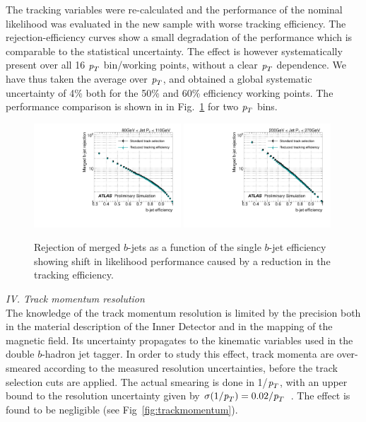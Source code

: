 The tracking variables were re-calculated and the performance of the nominal likelihood was evaluated in the new sample with worse tracking efficiency. The rejection-efficiency curves %
 show a small degradation of the performance which is comparable to the statistical uncertainty. The effect is however systematically present over all 16 ${\emph{p}_{T}}$ bin/working points, without a clear ${\emph{p}_{T}}$ dependence. We have thus taken the average over ${\emph{p}_{T}}$, and obtained a global systematic uncertainty of 4\% both for the 50\% and 60\% efficiency working points. The performance comparison is shown in in Fig.~\ref{fig:trackefficiency} for two ${\emph{p}_{T}}$ bins. %

\begin{figure}[tp]
\centering
\includegraphics[width=0.49\textwidth]{FIGS/systematics/LlhoodKDE_ISO_TrackingUncertaintyTest_rejvseff080.pdf}
\includegraphics[width=0.49\textwidth]{FIGS/systematics/LlhoodKDE_ISO_TrackingUncertaintyTest_rejvseff200.pdf}
\caption{Rejection of merged $b$-jets as a function of the single $b$-jet efficiency showing shift in likelihood performance caused by a reduction in the tracking efficiency.}
\label{fig:trackefficiency}
\end{figure}

\vspace{3mm}
{\em IV. Track momentum resolution}
\\[3mm]
The knowledge of the track momentum resolution is limited by the precision both in the material description of the Inner Detector and in the mapping of the magnetic field. Its uncertainty propagates to the kinematic variables used in the double $b$-hadron jet tagger. In order to study this effect, track momenta are over-smeared according to the measured resolution uncertainties, before the track selection cuts are applied.  %
The actual smearing is done in 1/${\emph{p}_{T}}$, with an upper bound to the resolution uncertainty given by $\sigma(1/{\emph{p}_{T}})=0.02/{\emph{p}_{T}}$~\cite{ATLAS-CONF-2010-009}. The effect is found to be negligible (see Fig~\ref{fig:trackmomentum}). %

